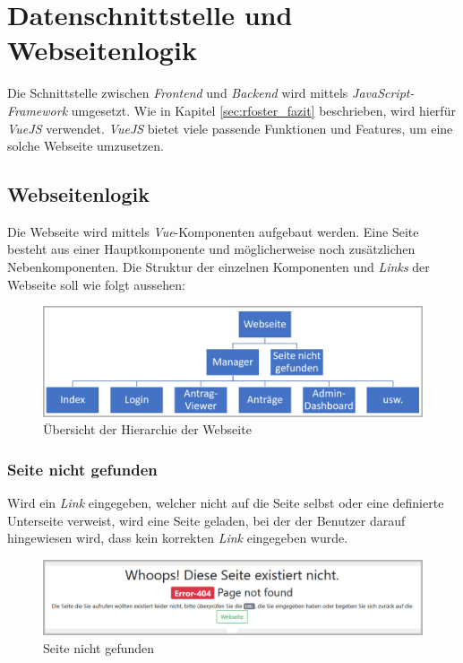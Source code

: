 \section{Datenschnittstelle und Webseitenlogik}
Die Schnittstelle zwischen \textit{Frontend} und \textit{Backend} wird mittels \textit{JavaScript-Framework} umgesetzt. Wie in Kapitel \autoref{sec:rfoster_fazit} beschrieben, wird hierfür \textit{VueJS} verwendet. \textit{VueJS} bietet viele passende Funktionen und Features, um  eine solche Webseite umzusetzen.
\subsection{Webseitenlogik}
\label{sec:webseitenlogik}
Die Webseite wird mittels \textit{Vue}-Komponenten aufgebaut werden. Eine Seite besteht aus einer Hauptkomponente und möglicherweise noch zusätzlichen Nebenkomponenten. Die Struktur der einzelnen Komponenten und \textit{Links} der Webseite soll wie folgt aussehen:
\begin{figure}[H]
	\centering
	\includegraphics[width=0.8\linewidth]{images/rfoster_konzept/Webseite_hierarchie}
	\caption[Hierarchie der Webseite]{Übersicht der Hierarchie der Webseite}
	\label{fig:webseitehierachie}
\end{figure}

\subsubsection{Seite nicht gefunden}
\label{sec:not_found}
Wird ein \textit{Link} eingegeben, welcher nicht auf die Seite selbst oder eine definierte Unterseite verweist, wird eine Seite geladen, bei der der Benutzer darauf hingewiesen wird, dass kein korrekten \textit{Link} eingegeben wurde.
\begin{figure}[H]
	\centering
	\includegraphics[width=0.6\linewidth]{images/rfoster_konzept/page_not_found}
	\caption[Seite nicht gefunden]{Seite nicht gefunden}
	\label{fig:pagenotfound}
\end{figure}

